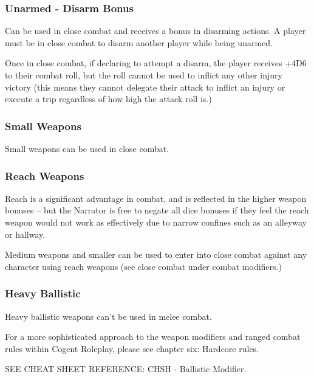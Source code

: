 \begin{displayquote}
    \subsubsection{Unarmed - Disarm Bonus}

    Can be used in close combat and receives a bonus in disarming actions. A player must be in close combat to disarm another player while being unarmed.

    Once in close combat, if declaring to attempt a disarm, the player receives +4D6 to their combat roll, but the roll cannot be used to inflict any other injury victory (this means they cannot delegate their attack to inflict an injury or execute a trip regardless of how high the attack roll is.)

    \subsubsection{Small Weapons}

    Small weapons can be used in close combat.

    \subsubsection{Reach Weapons}

    Reach is a significant advantage in combat, and is reflected in the higher weapon bonuses – but the Narrator is free to negate all dice bonuses if they feel the reach weapon would not work as effectively due to narrow confines such as an alleyway or hallway.

    Medium weapons and smaller can be used to enter into close combat against any character using reach weapons (see close combat under combat modifiers.) %

    \subsubsection{Heavy Ballistic}

    Heavy ballistic weapons can't be used in melee combat.
\end{displayquote}

For a more sophisticated approach to the weapon modifiers and ranged combat rules within Cogent Roleplay, please see chapter six: Hardcore rules. %

SEE CHEAT SHEET REFERENCE: CHSH - Ballistic Modifier.